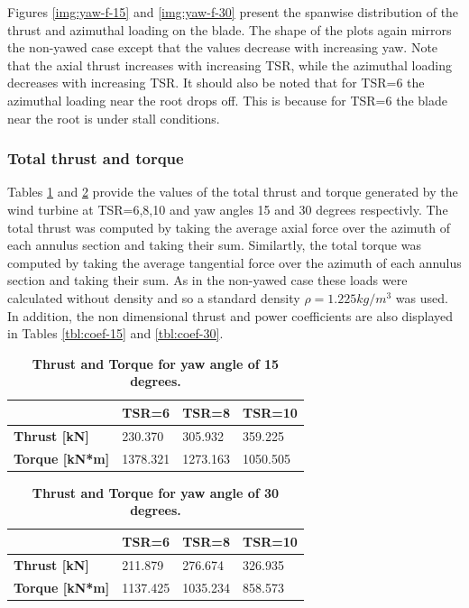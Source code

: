 Figures \ref{img:yaw-f-15} and \ref{img:yaw-f-30} present the spanwise distribution of the thrust and azimuthal loading on the blade. The shape of the plots again mirrors the non-yawed case except that the values decrease with increasing yaw. Note that the axial thrust increases with increasing TSR, while the azimuthal loading decreases with increasing TSR. It should also be noted that for TSR=6 the azimuthal loading near the root drops off. This is because for TSR=6 the blade near the root is under stall conditions.

\subsubsection{ \textbf{Total thrust and torque}}

Tables \ref{tbl:thrust-15} and \ref{tbl:thrust-30} provide the values of the total thrust and torque generated by the wind turbine at TSR=6,8,10 and yaw angles 15 and 30 degrees respectivly. The total thrust was computed by taking the average axial force over the azimuth of each annulus section and taking their sum. Similartly, the total torque was computed by taking the average tangential force over the azimuth of each annulus section and taking their sum. As in the non-yawed case these loads were calculated without density and so a standard density $\rho = 1.225 kg/m^3$ was used. In addition, the non dimensional thrust and power coefficients are also displayed in Tables \ref{tbl:coef-15} and \ref{tbl:coef-30}.
\begin{table}[htbp]
\caption{ \textbf{Thrust and Torque for yaw angle of 15 degrees.} }
\begin{tabular}{|l|l|l|l|}
\hline
   & \textbf{TSR=6} & \textbf{TSR=8} & \textbf{TSR=10}  \\ \hline
\textbf{Thrust {[}kN{]}} &   230.370    &  305.932    &   359.225     \\ \hline
\textbf{Torque {[}kN*m{]}} &  1378.321   &  1273.163     &   1050.505     \\ \hline
\end{tabular}
\label{tbl:thrust-15}
\end{table}

\begin{table}[htbp]
\caption{\textbf{Thrust and Torque for yaw angle of 30 degrees.}}
\begin{tabular}{|l|l|l|l|}
\hline
   & \textbf{TSR=6} & \textbf{TSR=8} & \textbf{TSR=10}  \\ \hline
\textbf{Thrust {[}kN{]}} &   211.879    &  276.674     &   326.935     \\ \hline
\textbf{Torque {[}kN*m{]}} &   1137.425    &  1035.234     &   858.573     \\ \hline
\end{tabular}
\label{tbl:thrust-30}
\end{table}

